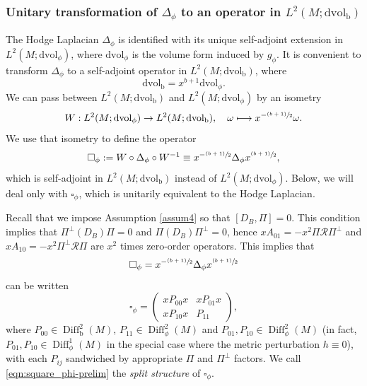 \documentclass[JEP,XML,SOM,Unicode,NoFloatCountersInSection,published]{cedram}
\newcommand\mto{\mathchoice{\longmapsto}{\mapsto}{\mapsto}{\mapsto}}
\newcommand{\psfrac}[2]{\sfrac{(#1)}{#2}}
\theoremstyle{plain}
\theoremstyle{definition}
\newcommand{\bb}{{\mathrm{b}}}
\newcommand{\dvol}{\mathrm{dvol}}
\DeclareMathOperator{\Diff}{Diff}
\begin{document}
\subsubsection{Unitary transformation of $\Delta_\phi$ to an operator in $L^2(M; \dvol_\bb)$}

The Hodge Laplacian $\Delta_{\phi}$ is identified with its unique self-adjoint extension in
$L^2(M; \dvol_\phi)$, where $\dvol_\phi$ is the volume form induced by $g_\phi$.
It is convenient to transform $\Delta_{\phi}$
to a self-adjoint operator in $L^2(M; \dvol_\bb)$,
where
\begin{equation}\label{dvb}
\dvol_\bb = x^{b+1} \dvol_\phi.
\end{equation}
We can pass between $L^2(M; \dvol_\bb)$ and $L^2(M; \dvol_\phi)$ by an isometry
\begin{equation}\label{T}
W: L^2(M; \dvol_\phi) \to L^2(M; \dvol_\bb), \quad \omega \mto x^{-\psfrac{b+1}{2}} \omega.
\end{equation}
We use that isometry to define the operator
\begin{equation*}
\square_\phi := W \circ \Delta_{\phi} \circ W^{-1} \equiv x^{-\psfrac{b+1}{2}} \Delta_{\phi} x^{\psfrac{b+1}{2}},
\end{equation*}
which is self-adjoint in $L^2(M; \dvol_\bb)$ instead of $L^2(M; \dvol_\phi)$.
Below, we will deal only with $\square_\phi$, which is unitarily equivalent to the
Hodge Laplacian.

Recall that we impose Assumption \ref{assum4} so that $[D_B, \Pi] = 0$.
This condition implies that $\Pi^{\bot}\left(D_{B}\right)\Pi = 0$ and $\Pi\left(D_{B}\right)\Pi^{\bot} = 0$, hence $xA_{01}=-x^2 \Pi
\mathscr{R}\Pi^\perp$ and $xA_{10}=-x^2\Pi^\perp\mathscr{R}\Pi$ are $x^2$ times zero-order operators.
This implies that
\[
\square_{\phi} = x^{-\psfrac{b+1}{2}} \Delta_{\phi}x^{\psfrac{b+1}{2}}
\]
can be written
\begin{equation}
\label{eqn:square_phi-prelim}
\square_\phi =
\begin{pmatrix}
xP_{00}x & xP_{01}x \\
xP_{10}x & P_{11}
\end{pmatrix},
\end{equation}
where $P_{00}\in\Diff^2_\bb(M)$, $P_{11}\in \Diff^2_\phi(M)$
and $P_{01}, P_{10}\in \Diff^2_\phi(M)$ (in fact, $P_{01}, P_{10}\in \Diff^1_\phi(M)$ in the special case where the metric perturbation
$h\equiv 0$),
with each $P_{ij}$ sandwiched by appropriate $\Pi$ and $\Pi^\perp$ factors.
We call \eqref{eqn:square_phi-prelim} the \textit{split structure} of $\square_\phi$.
\end{document}
